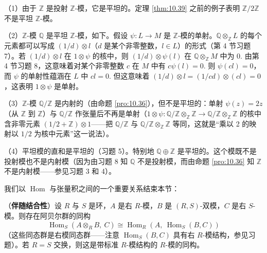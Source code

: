 \begin{example}
（1）由于 \(\mathbb{Z}\) 是投射 \(\mathbb{Z}\)-模，它是平坦的。定理 \ref{thm:10.39} 之前的例子表明 \(\mathbb{Z}/2\mathbb{Z}\) 不是平坦 \(\mathbb{Z}\)-模。

（2）\(\mathbb{Z}\)-模 \(\mathbb{Q}\) 是平坦 \(\mathbb{Z}\)-模，如下。假设 \(\psi : L \to M\) 是 \(\mathbb{Z}\)-模的单射。\(\mathbb{Q} \otimes_{\mathbb{Z}} L\) 的每个元素都可以写成 \((1/d) \otimes l\)（\(d\) 是某个非零整数，\(l \in L\)）的形式（第 4 节习题 7）。若 \((1/d) \otimes l\) 在 \(1 \otimes \psi\) 的核中，则 \((1/d) \otimes \psi(l)\) 在 \(\mathbb{Q} \otimes_{\mathbb{Z}} M\) 中为 0. 由第 4 节习题 8，这意味着对某个非零整数 \(c\) 在 \(M\) 中有 \(c\psi(l) = 0\). 则 \(\psi(cl) = 0\)，而 \(\psi\) 的单射性蕴涵在 \(L\) 中 \(cl = 0\). 但这意味着 \((1/d) \otimes l = (1/cd) \otimes (cl) = 0\)，这表明 \(1 \otimes \psi\) 是单射。

（3）\(\mathbb{Z}\)-模 \(\mathbb{Q}/\mathbb{Z}\) 是内射的（由命题 \ref{pro:10.36}），但不是平坦的：单射 \(\psi(z) = 2z\)（从 \(\mathbb{Z}\) 到 \(\mathbb{Z}\)）与 \(\mathbb{Q}/\mathbb{Z}\) 作张量后不再是单射（\(1 \otimes \psi : \mathbb{Q}/\mathbb{Z} \otimes_{\mathbb{Z}} \mathbb{Z} \to \mathbb{Q}/\mathbb{Z} \otimes_{\mathbb{Z}} \mathbb{Z}\) 的核中含非零元素 \((1/2+\mathbb{Z}) \otimes 1\)——把 \(\mathbb{Q}/\mathbb{Z}\) 与 \(\mathbb{Q}/\mathbb{Z} \otimes_{\mathbb{Z}} \mathbb{Z}\) 等同，这就是“乘以 2 的映射以 \(1/2\) 为核中元素”这一说法）。

（4）平坦模的直和是平坦的（习题 5）。特别地 \(\mathbb{Q} \oplus \mathbb{Z}\) 是平坦的。这个模既不是投射模也不是内射模（因为由习题 8 知 \(\mathbb{Q}\) 不是投射模，而由命题 \ref{pro:10.36} 知 \(\mathbb{Z}\) 不是内射模——参见习题 3 和 4）。
\end{example}

我们以 \(\operatorname{Hom}\) 与张量积之间的一个重要关系结束本节：

\begin{theorem}\label{thm:10.43}
（\textbf{伴随结合性}）设 \(R\) 与 \(S\) 是环，\(A\) 是右 \(R\)-模，\(B\) 是 \((R, S)\)-双模，\(C\) 是右 \(S\)-模。则存在阿贝尔群的同构
\[
\operatorname{Hom}_S(A \otimes_R B,\ C) \cong \operatorname{Hom}_R(A,\ \operatorname{Hom}_S(B, C))
\]
（这些同态群是右模同态群——注意 \(\operatorname{Hom}_S(B, C)\) 具有右 \(R\)-模结构，参见习题）。若 \(R = S\) 交换，则这是带标准 \(R\)-模结构的 \(R\)-模的同构。
\end{theorem}


